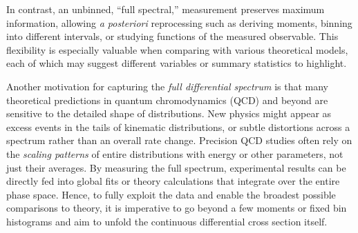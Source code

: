     In contrast, an unbinned, ``full spectral,'' measurement preserves maximum information, allowing \textit{a posteriori} reprocessing such as deriving moments, binning into different intervals, or studying functions of the measured observable.
    This flexibility is especially valuable when comparing with various theoretical models, each of which may suggest different variables or summary statistics to highlight.

    Another motivation for capturing the \emph{full differential spectrum} is that many theoretical predictions in quantum chromodynamics (QCD) and beyond are sensitive to the detailed shape of distributions.
    New physics might appear as excess events in the tails of kinematic distributions, or subtle distortions across a spectrum rather than an overall rate change.
    Precision QCD studies often rely on the \emph{scaling patterns} of entire distributions with energy or other parameters, not just their averages.
    By measuring the full spectrum, experimental results can be directly fed into global fits or theory calculations that integrate over the entire phase space.
    Hence, to fully exploit the data and enable the broadest possible comparisons to theory, it is imperative to go beyond a few moments or fixed bin histograms and aim to unfold the continuous differential cross section itself.
